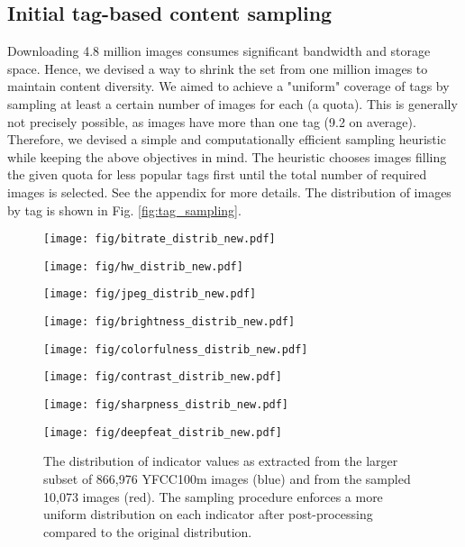 \documentclass[10pt,journal,compsoc]{IEEEtran}
\begin{document}
\subsection{Initial tag-based content sampling}
\label{sec:tagsampling}
Downloading 4.8 million images consumes significant bandwidth and storage space. Hence, we devised a way to shrink the set from one million images to maintain content diversity. We aimed to achieve a  "uniform" coverage of tags by sampling at least a certain number of images for each (a quota). This is generally not precisely possible, as images have more than one tag (9.2 on average). Therefore, we devised a simple and computationally efficient sampling heuristic while keeping the above objectives in mind. The heuristic chooses images filling the given quota for less popular tags first until the total number of required images is selected. See the appendix for more details. The distribution of images by tag is shown in Fig. \ref{fig:tag_sampling}.

\begin{figure*}[t]
\centering
\begin{minipage}{0.119\linewidth}
\centerline{\texttt{[image: fig/bitrate\_distrib\_new.pdf]}}
\end{minipage}
\begin{minipage}{0.119\linewidth}
\centerline{\texttt{[image: fig/hw\_distrib\_new.pdf]}}
\end{minipage}
\begin{minipage}{0.119\linewidth}
\centerline{\texttt{[image: fig/jpeg\_distrib\_new.pdf]}}
\end{minipage}
\begin{minipage}{0.119\linewidth}
\centerline{\texttt{[image: fig/brightness\_distrib\_new.pdf]}}
\end{minipage}
\begin{minipage}{0.119\linewidth}
\centerline{\texttt{[image: fig/colorfulness\_distrib\_new.pdf]}}
\end{minipage}
\begin{minipage}{0.119\linewidth}
\centerline{\texttt{[image: fig/contrast\_distrib\_new.pdf]}}
\end{minipage}
\begin{minipage}{0.119\linewidth}
\centerline{\texttt{[image: fig/sharpness\_distrib\_new.pdf]}}
\end{minipage}
\begin{minipage}{0.119\linewidth}
\centerline{\texttt{[image: fig/deepfeat\_distrib\_new.pdf]}}
\end{minipage}
\caption{The distribution of indicator values as extracted from the larger subset of 866,976 YFCC100m images (blue) and from the sampled 10,073 images (red). The sampling procedure enforces a more uniform distribution on each indicator after post-processing compared to the original distribution.}
\label{fig:unisample}
\end{figure*}
\end{document}
